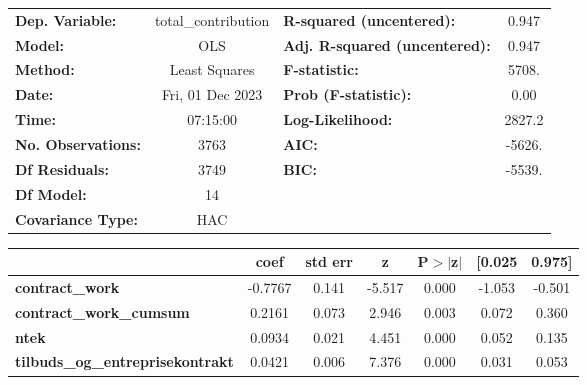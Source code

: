 \begin{center}
\begin{tabular}{lclc}
\toprule
\textbf{Dep. Variable:}                     & total\_contribution & \textbf{  R-squared (uncentered):}      &     0.947   \\
\textbf{Model:}                             &         OLS         & \textbf{  Adj. R-squared (uncentered):} &     0.947   \\
\textbf{Method:}                            &    Least Squares    & \textbf{  F-statistic:       }          &     5708.   \\
\textbf{Date:}                              &   Fri, 01 Dec 2023  & \textbf{  Prob (F-statistic):}          &     0.00    \\
\textbf{Time:}                              &       07:15:00      & \textbf{  Log-Likelihood:    }          &    2827.2   \\
\textbf{No. Observations:}                  &          3763       & \textbf{  AIC:               }          &    -5626.   \\
\textbf{Df Residuals:}                      &          3749       & \textbf{  BIC:               }          &    -5539.   \\
\textbf{Df Model:}                          &            14       & \textbf{                     }          &             \\
\textbf{Covariance Type:}                   &         HAC         & \textbf{                     }          &             \\
\bottomrule
\end{tabular}
\begin{tabular}{lcccccc}
                                            & \textbf{coef} & \textbf{std err} & \textbf{z} & \textbf{P$> |$z$|$} & \textbf{[0.025} & \textbf{0.975]}  \\
\midrule
\textbf{contract\_work}                     &      -0.7767  &        0.141     &    -5.517  &         0.000        &       -1.053    &       -0.501     \\
\textbf{contract\_work\_cumsum}             &       0.2161  &        0.073     &     2.946  &         0.003        &        0.072    &        0.360     \\
\textbf{ntek}                               &       0.0934  &        0.021     &     4.451  &         0.000        &        0.052    &        0.135     \\
\textbf{tilbuds\_og\_entreprisekontrakt}    &       0.0421  &        0.006     &     7.376  &         0.000        &        0.031    &        0.053     \\

\end{tabular}
\end{center}
